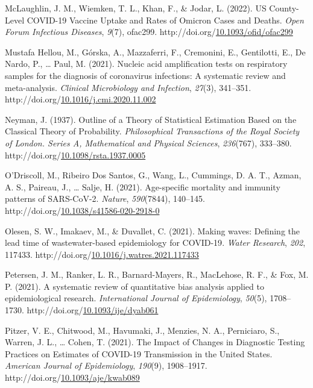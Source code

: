 \documentclass[12pt,twoside]{smiththesis}
\newlength{\cslhangindent}
\newenvironment{CSLReferences}[2] %
 {%
\setlength{\parindent}{0pt}
\ifodd #1 \everypar{\setlength{\hangindent}{\cslhangindent}}\ignorespaces\fi
\ifnum #2 > 0
\setlength{\parskip}{#2\baselineskip}
  \fi
}%
{}
\begin{document}
\begin{CSLReferences}{1}{0}
\leavevmode{}%
McLaughlin, J. M., Wiemken, T. L., Khan, F., \& Jodar, L. (2022). {US County-Level COVID-19 Vaccine Uptake} and {Rates} of {Omicron Cases} and {Deaths}. \emph{Open Forum Infectious Diseases}, \emph{9}(7), ofac299. http://doi.org/\href{https://doi.org/10.1093/ofid/ofac299}{10.1093/ofid/ofac299}

\leavevmode{}%
Mustafa Hellou, M., Górska, A., Mazzaferri, F., Cremonini, E., Gentilotti, E., De Nardo, P., \ldots{} Paul, M. (2021). Nucleic acid amplification tests on respiratory samples for the diagnosis of coronavirus infections: A systematic review and meta-analysis. \emph{Clinical Microbiology and Infection}, \emph{27}(3), 341--351. http://doi.org/\href{https://doi.org/10.1016/j.cmi.2020.11.002}{10.1016/j.cmi.2020.11.002}

\leavevmode{}%
Neyman, J. (1937). Outline of a {Theory} of {Statistical Estimation Based} on the {Classical Theory} of {Probability}. \emph{Philosophical Transactions of the Royal Society of London. Series A, Mathematical and Physical Sciences}, \emph{236}(767), 333--380. http://doi.org/\href{https://doi.org/10.1098/rsta.1937.0005}{10.1098/rsta.1937.0005}

\leavevmode{}%
O'Driscoll, M., Ribeiro Dos Santos, G., Wang, L., Cummings, D. A. T., Azman, A. S., Paireau, J., \ldots{} Salje, H. (2021). Age-specific mortality and immunity patterns of {SARS-CoV-2}. \emph{Nature}, \emph{590}(7844), 140--145. http://doi.org/\href{https://doi.org/10.1038/s41586-020-2918-0}{10.1038/s41586-020-2918-0}

\leavevmode{}%
Olesen, S. W., Imakaev, M., \& Duvallet, C. (2021). Making waves: {Defining} the lead time of wastewater-based epidemiology for {COVID-19}. \emph{Water Research}, \emph{202}, 117433. http://doi.org/\href{https://doi.org/10.1016/j.watres.2021.117433}{10.1016/j.watres.2021.117433}

\leavevmode{}%
Petersen, J. M., Ranker, L. R., Barnard-Mayers, R., MacLehose, R. F., \& Fox, M. P. (2021). A systematic review of quantitative bias analysis applied to epidemiological research. \emph{International Journal of Epidemiology}, \emph{50}(5), 1708--1730. http://doi.org/\href{https://doi.org/10.1093/ije/dyab061}{10.1093/ije/dyab061}

\leavevmode{}%
Pitzer, V. E., Chitwood, M., Havumaki, J., Menzies, N. A., Perniciaro, S., Warren, J. L., \ldots{} Cohen, T. (2021). The {Impact} of {Changes} in {Diagnostic Testing Practices} on {Estimates} of {COVID-19 Transmission} in the {United States}. \emph{American Journal of Epidemiology}, \emph{190}(9), 1908--1917. http://doi.org/\href{https://doi.org/10.1093/aje/kwab089}{10.1093/aje/kwab089}


\end{CSLReferences}
\end{document}
